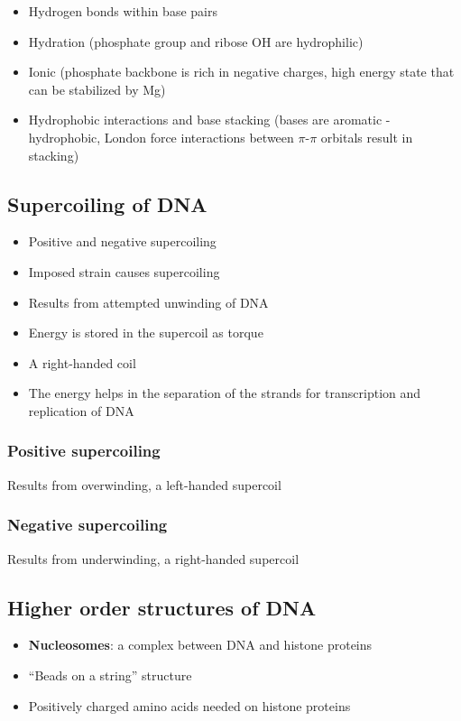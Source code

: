 \documentclass[letterpaper, 12pt]{article}
\begin{document}
\begin{itemize}
\item Hydrogen bonds within base pairs
\item Hydration (phosphate group and ribose OH are hydrophilic)
\item Ionic (phosphate backbone is rich in negative charges, high energy state that can be stabilized by Mg)
\item Hydrophobic interactions and base stacking (bases are aromatic - hydrophobic, London force interactions between $\pi$-$\pi$ orbitals result in stacking)
\end{itemize}

\subsection*{Supercoiling of DNA}

\begin{itemize}
\item Positive and negative supercoiling
\item Imposed strain causes supercoiling
\item Results from attempted unwinding of DNA
\item Energy is stored in the supercoil as torque
\item A right-handed coil
\item The energy helps in the separation of the strands for transcription and replication of DNA
\end{itemize}

\subsubsection*{Positive supercoiling}
Results from overwinding, a left-handed supercoil

\subsubsection*{Negative supercoiling}
Results from underwinding, a right-handed supercoil

\subsection*{Higher order structures of DNA}

\begin{itemize}
\item \textbf{Nucleosomes}: a complex between DNA and histone proteins
\item ``Beads on a string'' structure
\item Positively charged amino acids needed on histone proteins
\end{itemize}
\end{document}
